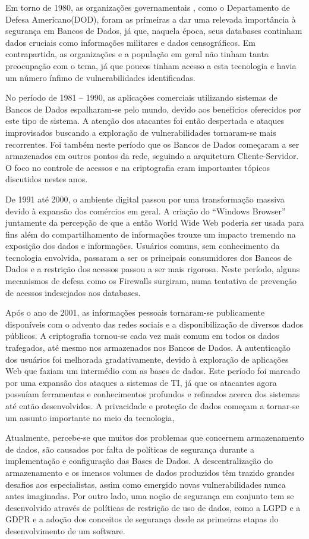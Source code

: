 Em torno de 1980, as organizações governamentais , como o Departamento de Defesa Americano(DOD), foram as primeiras a dar uma relevada importância à segurança em Bancos de Dados, já que, naquela época, seus databases continham dados cruciais como informações militares e dados censográficos. Em contrapartida, as organizações e a população em geral não tinham tanta preocupação com o tema, já que poucos tinham acesso a esta tecnologia e havia um número ínfimo de vulnerabilidades  identificadas.

No período de 1981 – 1990, as aplicações comerciais utilizando sistemas de Bancos de Dados espalharam-se pelo mundo, devido aos benefícios oferecidos por este tipo de sistema. A atenção dos atacantes foi então despertada e ataques improvisados buscando a exploração de vulnerabilidades tornaram-se mais recorrentes. Foi também neste período que os Bancos de Dados começaram a ser armazenados em outros pontos da rede, seguindo a arquitetura Cliente-Servidor. O foco no controle de acessos e na criptografia eram importantes tópicos discutidos nestes anos.

De 1991 até 2000, o ambiente digital passou por uma transformação massiva devido à expansão dos comércios em geral. A criação do “Windows Browser” juntamente da percepção de que a então World Wide Web poderia ser usada para fins além do compartilhamento de informações trouxe um impacto tremendo na exposição dos dados e informações. Usuários comuns, sem conhecimento da tecnologia envolvida, passaram a ser os principais consumidores dos Bancos de Dados e a restrição dos acessos passou a ser mais rigorosa. Neste período, alguns mecanismos de defesa como  os Firewalls surgiram, numa tentativa de prevenção de acessos indesejados aos databases.

Após o ano de 2001, as informações pessoais tornaram-se publicamente disponíveis com o advento das redes sociais e a disponibilização de diversos dados públicos. A criptografia tornou-se cada vez mais comum em todos os dados trafegados, até mesmo nos armazenados nos Bancos de Dados. A autenticação dos usuários foi melhorada gradativamente, devido à exploração de aplicações Web que faziam um intermédio com as bases de dados. Este período foi marcado por uma expansão dos ataques a sistemas de TI, já que os atacantes agora possuíam  ferramentas e conhecimentos profundos e refinados acerca dos sistemas até então desenvolvidos. A privacidade e proteção de dados começam a tornar-se um assunto importante no meio da tecnologia,

Atualmente, percebe-se que muitos dos problemas que concernem armazenamento de dados, são causados por falta de políticas de segurança durante a implementação e configuração das Bases de Dados. A descentralização do armazenamento e os imensos volumes de dados produzidos têm trazido grandes desafios aos especialistas, assim como emergido novas vulnerabilidades nunca antes imaginadas. Por outro lado, uma noção de segurança em conjunto tem se desenvolvido através de políticas de restrição de uso de dados, como a LGPD e a GDPR e a adoção dos conceitos de segurança desde as primeiras etapas do desenvolvimento de um software.

